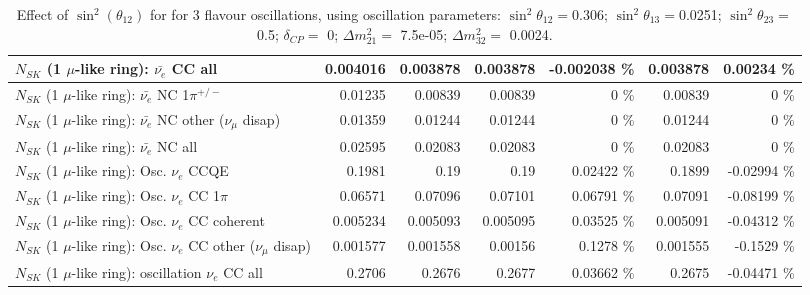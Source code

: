 \begin{table}
\begin{tabular}{| l | r | r | r  r | r  r |}
                            $N_{SK}$ (1 $\mu$-like ring): $\bar{\nu_{e}}$ CC all &        0.004016 &        0.003878 &        0.003878 & -0.002038 \%  &        0.003878 &  0.00234 \%  \\ 
\hline
                     $N_{SK}$ (1 $\mu$-like ring): $\bar{\nu_e}$ NC 1$\pi^{+/-}$ &         0.01235 &         0.00839 &         0.00839 &        0 \%  &         0.00839 &        0 \%  \\ 
          $N_{SK}$ (1 $\mu$-like ring): $\bar{\nu_e}$ NC other ($\nu_\mu$ disap) &         0.01359 &         0.01244 &         0.01244 &        0 \%  &         0.01244 &        0 \%  \\ 
                            $N_{SK}$ (1 $\mu$-like ring): $\bar{\nu_{e}}$ NC all &         0.02595 &         0.02083 &         0.02083 &        0 \%  &         0.02083 &        0 \%  \\ 
\hline
\hline
\hline
                                 $N_{SK}$ (1 $\mu$-like ring): Osc. $\nu_e$ CCQE &          0.1981 &            0.19 &            0.19 &  0.02422 \%  &          0.1899 & -0.02994 \%  \\ 
                            $N_{SK}$ (1 $\mu$-like ring): Osc. $\nu_e$ CC 1$\pi$ &         0.06571 &         0.07096 &         0.07101 &  0.06791 \%  &         0.07091 & -0.08199 \%  \\ 
                          $N_{SK}$ (1 $\mu$-like ring): Osc. $\nu_e$ CC coherent &        0.005234 &        0.005093 &        0.005095 &  0.03525 \%  &        0.005091 & -0.04312 \%  \\ 
           $N_{SK}$ (1 $\mu$-like ring): Osc. $\nu_e$ CC other ($\nu_\mu$ disap) &        0.001577 &        0.001558 &         0.00156 &   0.1278 \%  &        0.001555 &  -0.1529 \%  \\ 
                        $N_{SK}$ (1 $\mu$-like ring): oscillation $\nu_e$ CC all &          0.2706 &          0.2676 &          0.2677 &  0.03662 \%  &          0.2675 & -0.04471 \%  \\ 
\hline
\hline
\end{tabular}
\caption{ Effect of $\sin^2(\theta_{12})$ for for 3 flavour oscillations, using oscillation parameters:  $\sin^2\theta_{12} = $0.306; $\sin^2\theta_{13} = $0.0251; $\sin^2\theta_{23} = $0.5; $\delta_{CP} = $        0; $\Delta m^2_{21} = $    7.5e-05; $\Delta m^2_{32} = $    0.0024. }
\label{tab:num_mixing12_1RmuT_3f_osc_t13:0.0251}
\end{table}
\clearpage

